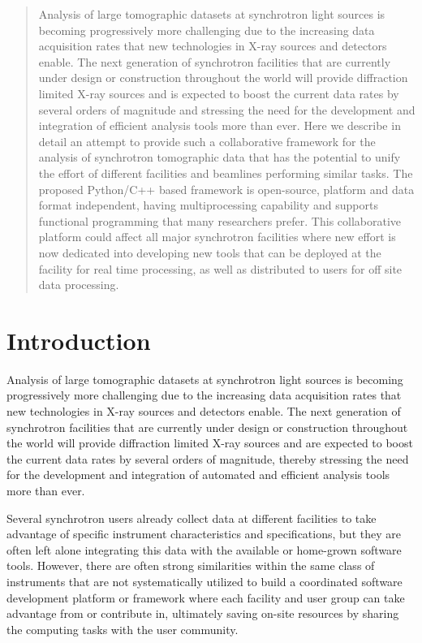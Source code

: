 \documentclass[pdf]{iucr}              %
\begin{document}
\begin{abstract}
Analysis of large tomographic datasets at synchrotron light sources is becoming progressively more challenging due to the increasing data acquisition rates that new technologies in X-ray sources and detectors enable. The next generation of synchrotron facilities that are currently under design or construction throughout the world will provide diffraction limited X-ray sources and is expected to boost the current data rates by several orders of magnitude and stressing the need for the development and integration of efficient analysis tools more than ever. Here we describe in detail an attempt to provide such a collaborative framework for the analysis of synchrotron tomographic data that has the potential to unify the effort of different facilities and beamlines performing similar tasks. The proposed Python/C++ based framework is open-source, platform and data format independent,  having multiprocessing capability and supports functional programming that many researchers prefer. This collaborative platform could affect all major synchrotron facilities where new effort is now dedicated into developing new tools that can be deployed at the facility for real time processing, as well as distributed to users for off site data processing.
\end{abstract}


\section{Introduction}

Analysis of large tomographic datasets at synchrotron light sources is becoming progressively more challenging  due to the increasing data acquisition rates that new technologies in X-ray sources and detectors enable. The next generation of synchrotron facilities that are currently under design or construction throughout the world will provide diffraction limited X-ray sources and are expected to boost the current data rates by several orders of magnitude, thereby stressing the need for the development and integration of automated and efficient analysis tools more than ever. 

Several synchrotron users already collect data at different facilities to take advantage of specific instrument characteristics and specifications, but they are often left alone integrating this data with the available or home-grown software tools. However, there are often strong similarities within the same class of instruments that are not systematically utilized to build a coordinated software development platform or framework where each facility and user group can take advantage from or contribute in, ultimately saving on-site resources by sharing the computing tasks with the user community. 
\end{document}
